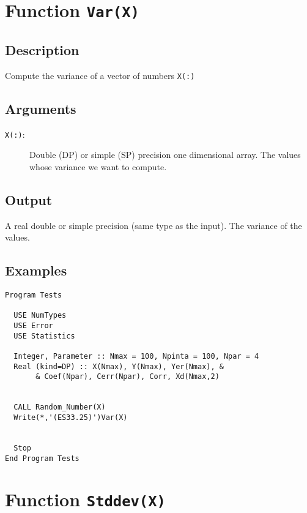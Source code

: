 \section{Function \texttt{Var(X)}}

\subsection{Description}

Compute the variance of a vector of numbers \texttt{X(:)}

\subsection{Arguments}

\begin{description}
\item[\texttt{X(:)}:] Double (DP) or simple (SP) precision one
  dimensional array. The values  whose variance we want to compute.
\end{description}

\subsection{Output}

A real double or simple precision (same type as the input). The
variance of the values.

\subsection{Examples}

\begin{lstlisting}[emph=Var,
                   emphstyle=\color{blue},
                   frame=trBL,
                   caption=Computing the Variance of a set of numbers.,
                   label=var]
Program Tests

  USE NumTypes
  USE Error
  USE Statistics

  Integer, Parameter :: Nmax = 100, Npinta = 100, Npar = 4
  Real (kind=DP) :: X(Nmax), Y(Nmax), Yer(Nmax), &
       & Coef(Npar), Cerr(Npar), Corr, Xd(Nmax,2)


  CALL Random_Number(X)
  Write(*,'(ES33.25)')Var(X)


  Stop
End Program Tests
\end{lstlisting}


\section{Function \texttt{Stddev(X)}}

